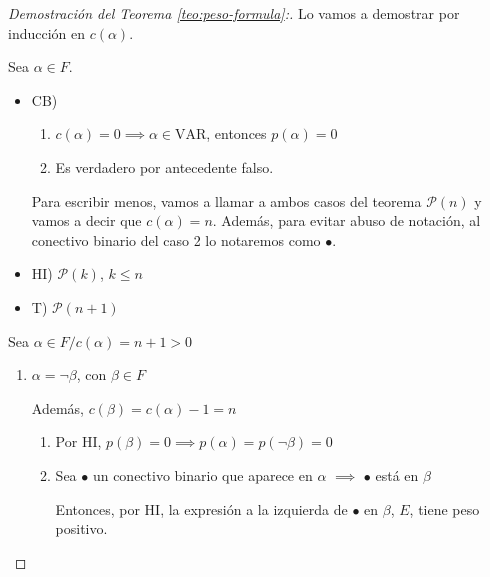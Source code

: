 \begin{proof}[Demostración del Teorema \ref{teo:peso-formula}:] \phantom{.}

    Lo vamos a demostrar por inducción en $c(\alpha)$.

    Sea $\alpha \in F$.

    \begin{itemize}
        \item CB) 
        \begin{enumerate}
            \item $c(\alpha) = 0 \implies \alpha \in \mathrm{VAR}$, entonces 
            $p(\alpha)=0$
            \item Es verdadero por antecedente falso.
        \end{enumerate}

        Para escribir menos, vamos a llamar a ambos casos del teorema 
        $\mathcal{P}(n)$ y vamos a decir que $c(\alpha)=n$. 
        Además, para evitar abuso de notación, al conectivo binario del caso
        2 lo notaremos como $\bullet$.

        \item HI) $\mathcal{P}(k)$, $k \leq n$
        \item T) $\mathcal{P}(n+1)$
    \end{itemize}       

    Sea $\alpha \in F / c(\alpha) =  n+1 > 0$

    \begin{enumerate}[%
                labelindent=*,
                style=multiline,
                leftmargin=*,
                align=left,
                leftmargin=2\parindent,
                label=Caso \arabic*)]
        \item $\alpha = \neg \beta$, con $\beta \in F$

            Además, $c(\beta) = c(\alpha) -1 = n$

            \begin{enumerate}
                \item Por HI, $p(\beta)=0 \implies p(\alpha) 
                    = p(\neg \beta) = 0$

                    \item Sea $\bullet$ un conectivo binario que aparece
                        en $\alpha$ $\implies$ $\bullet$ está en $\beta$

                Entonces, por HI, la expresión a la izquierda de $\bullet$
                en $\beta$, $E$, tiene peso positivo.


\end{enumerate}
\end{enumerate}
\end{proof}
